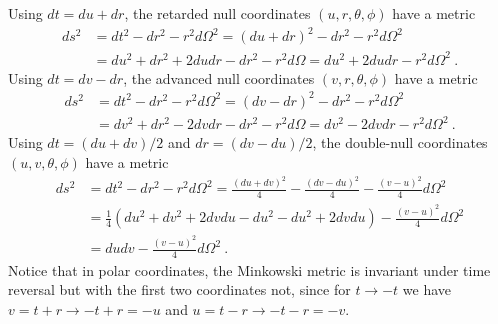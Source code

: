     Using $dt = du + dr$, the retarded null coordinates $(u, r, \theta, \phi)$ have a metric 
    \begin{equation*}
    \begin{aligned}
        ds^2 &= dt^2 - dr^2 - r^2 d\Omega^2 = (du + dr)^2 - dr^2 - r^2 d\Omega^2 \\ & = du^2 +dr^2 + 2 du dr - dr^2 - r^2 d\Omega = du^2 + 2 du dr - r^2 d\Omega^2 ~.
    \end{aligned}
    \end{equation*}
    Using $dt = dv - dr$, the advanced null coordinates $(v, r, \theta, \phi)$ have a metric 
    \begin{equation*}
    \begin{aligned}
        ds^2 & = dt^2 - dr^2 - r^2 d\Omega^2 = (dv - dr)^2 - dr^2 - r^2 d\Omega^2 \\ & = dv^2 + dr^2 - 2 dv dr - dr^2 - r^2 d\Omega = dv^2 - 2 dv dr - r^2 d\Omega^2 ~.
    \end{aligned}
    \end{equation*}
    Using $dt = (du + dv)/2$ and $dr = (dv - du)/2$, the double-null coordinates $(u, v, \theta, \phi)$ have a metric 
    \begin{equation*}
    \begin{aligned}
        ds^2 & = dt^2 - dr^2 - r^2 d\Omega^2 = \frac{(du + dv)^2}{4} - \frac{(dv-du)^2}{4} - \frac{(v-u)^2}{4} d\Omega^2 \\ & = \frac{1}{4} (du^2 + dv^2 + 2 dv du - du^2 - du^2 + 2 dv du) - \frac{(v-u)^2}{4} d\Omega^2 \\ & = dudv - \frac{(v-u)^2}{4} d\Omega^2 ~.
    \end{aligned}
    \end{equation*}
    Notice that in polar coordinates, the Minkowski metric is invariant under time reversal but with the first two coordinates not, since for $t \rightarrow -t$ we have $v = t + r  \rightarrow - t + r = - u$ and $u = t - r  \rightarrow - t - r = - v$. 

